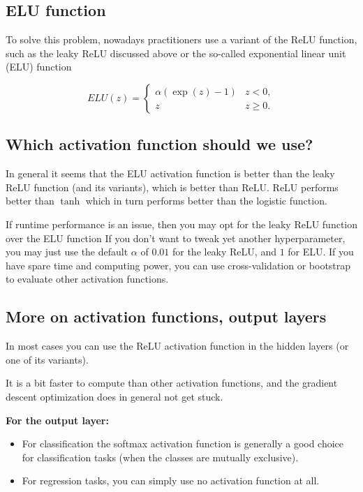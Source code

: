 \documentclass[%
oneside,                 %
final,                   %
10pt]{article}
\begin{document}
\subsection{ELU function}

To solve this problem, nowadays practitioners use a variant of the
ReLU function, such as the leaky ReLU discussed above or the so-called
exponential linear unit (ELU) function

\[
ELU(z) = \left\{\begin{array}{cc} \alpha\left( \exp{(z)}-1\right) & z < 0,\\  z & z \ge 0.\end{array}\right. 
\]

\subsection{Which activation function should we use?}

In general it seems that the ELU activation function is better than
the leaky ReLU function (and its variants), which is better than
ReLU. ReLU performs better than $\tanh$ which in turn performs better
than the logistic function.

If runtime performance is an issue, then you may opt for the leaky
ReLU function over the ELU function If you don’t want to tweak yet
another hyperparameter, you may just use the default $\alpha$ of
$0.01$ for the leaky ReLU, and $1$ for ELU. If you have spare time and
computing power, you can use cross-validation or bootstrap to evaluate
other activation functions.

\subsection{More on activation functions, output layers}

In most cases you can use the ReLU activation function in the hidden
layers (or one of its variants).

It is a bit faster to compute than other activation functions, and the
gradient descent optimization does in general not get stuck.

\textbf{For the output layer:}

\begin{itemize}
\item For classification the softmax activation function is generally a good choice for classification tasks (when the classes are mutually exclusive).

\item For regression tasks, you can simply use no activation function at all.
\end{itemize}
\end{document}
